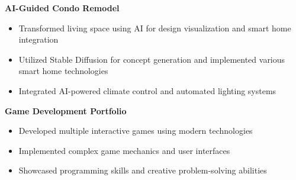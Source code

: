 \documentclass[11pt,letterpaper]{article}
\begin{document}
\textbf{AI-Guided Condo Remodel}
\begin{itemize}
    \item Transformed living space using AI for design visualization and smart home integration
    \item Utilized Stable Diffusion for concept generation and implemented various smart home technologies
    \item Integrated AI-powered climate control and automated lighting systems
\end{itemize}

\textbf{Game Development Portfolio}
\begin{itemize}
    \item Developed multiple interactive games using modern technologies
    \item Implemented complex game mechanics and user interfaces
    \item Showcased programming skills and creative problem-solving abilities
\end{itemize}
\end{document}
